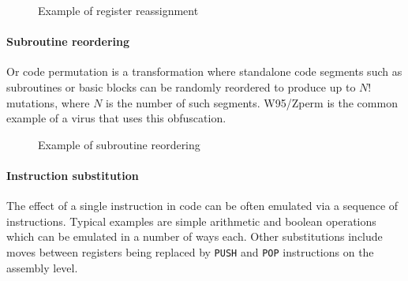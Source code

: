 \begin{figure}[H]
    \centering
    \caption{Example of register reassignment}
    \label{fig_obf_regswap}
\end{figure}

\paragraph*{Subroutine reordering}
Or code permutation is a transformation where standalone code segments such as subroutines or basic blocks can be randomly reordered to produce up to $N!$ mutations, where $N$ is the number of such segments. W95/Zperm is the common example of a virus that uses this obfuscation.

\begin{figure}[H]
    \centering
    \caption{Example of subroutine reordering}
    \label{fig_obf_perm}
\end{figure}

\paragraph*{Instruction substitution}
The effect of a single instruction in code can be often emulated via a sequence of instructions. Typical examples are simple arithmetic and boolean operations which can be emulated in a number of ways each. Other substitutions include moves between registers being replaced by \texttt{PUSH} and \texttt{POP} instructions on the assembly level.

